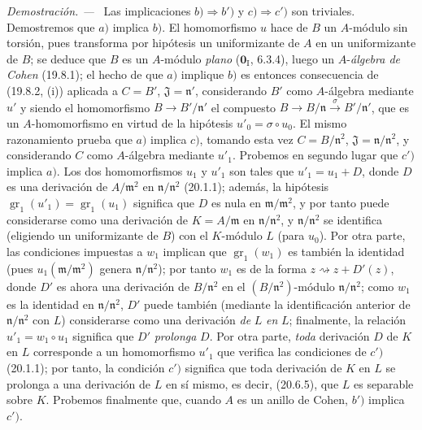 \documentclass[10pt,oneside]{book}
\newenvironment{proof}{%
  \par\medskip\noindent\textit{Demostración. ---\ }}{\par}
\begin{document}
\begin{proof}
Las implicaciones $b)\Rightarrow b')$ y $c)\Rightarrow c')$ son triviales.
Demostremos que $a)$ implica $b)$.
El homomorfismo $u$ hace de $B$ un $A$-módulo sin torsión, pues transforma por
hipótesis un uniformizante de $A$ en un uniformizante de $B$; se deduce que
$B$ es un $A$-módulo \emph{plano} ($\mathbf{0}_{\mathrm I}$, 6.3.4), luego un $A$-\emph{álgebra de
Cohen} (19.8.1); el hecho de que $a)$ implique $b)$ es entonces consecuencia de
(19.8.2, (i)) aplicada a $C=B'$, $\mathfrak J=\mathfrak n'$,
considerando $B'$ como $A$-álgebra mediante $u'$ y siendo el homomorfismo
$B\to B'/\mathfrak n'$ el compuesto
$B\to B/\mathfrak n\xrightarrow{\sigma}B'/\mathfrak n'$, que es un $A$-homomorfismo en
virtud de la hipótesis $u'_0=\sigma\circ u_0$. El mismo razonamiento prueba que
$a)$ implica $c)$, tomando esta vez $C=B/\mathfrak n^2$,
$\mathfrak J=\mathfrak n/\mathfrak n^2$, y considerando $C$ como
$A$-álgebra mediante $u'_1$.
Probemos en segundo lugar que $c')$ implica $a)$. Los dos homomorfismos
$u_1$ y $u'_1$ son tales que $u'_1=u_1+D$, donde $D$ es una derivación de
$A/\mathfrak m^2$ en $\mathfrak n/\mathfrak n^2$ (20.1.1); además,
la hipótesis $\operatorname{gr}_1(u'_1)=\operatorname{gr}_1(u_1)$ significa
que $D$ es nula en $\mathfrak m/\mathfrak m^2$, y por tanto puede
considerarse como una derivación de $K=A/\mathfrak m$ en
$\mathfrak n/\mathfrak n^2$, y $\mathfrak n/\mathfrak n^2$ se identifica
(eligiendo un uniformizante de $B$) con el $K$-módulo $L$ (para $u_0$).
Por otra parte, las condiciones impuestas a $w_1$ implican que
$\operatorname{gr}_1(w_1)$ es también la identidad (pues
$u_1(\mathfrak m/\mathfrak m^2)$ genera
$\mathfrak n/\mathfrak n^2$); por tanto $w_1$ es de la forma
$z\rightsquigarrow z+D'(z)$, donde $D'$ es ahora una derivación de
$B/\mathfrak n^2$ en el $(B/\mathfrak n^2)$-módulo
$\mathfrak n/\mathfrak n^2$; como $w_1$ es la identidad en
$\mathfrak n/\mathfrak n^2$, $D'$ puede también (mediante la identificación
anterior de $\mathfrak n/\mathfrak n^2$ con $L$) considerarse como una
derivación \emph{de} $L$ \emph{en} $L$; finalmente, la relación $u'_1=w_1\circ u_1$
significa que $D'$ \emph{prolonga} $D$. Por otra parte, \emph{toda} derivación $D$
de $K$ en $L$ corresponde a un homomorfismo $u'_1$ que verifica las condiciones
de $c')$ (20.1.1); por tanto, la condición $c')$ significa que toda derivación de
$K$ en $L$ se prolonga a una derivación de $L$ en sí mismo, es decir,
(20.6.5), que $L$ es separable sobre $K$.
Probemos finalmente que, cuando $A$ es un anillo de Cohen, $b')$ implica $c')$.

\end{proof}
\end{document}
